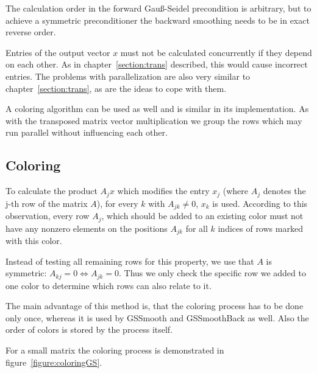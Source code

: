 \documentclass[a4paper,11pt]{scrartcl}
\begin{document}
The calculation order in the forward Gauß-Seidel precondition is arbitrary,
but to achieve a symmetric preconditioner the backward smoothing needs to be
in exact reverse order.

Entries of the output vector $x$ must not be calculated concurrently if they
depend on each other. As in chapter~\ref{section:trans} described, this would
cause incorrect entries. The problems with parallelization are also very
similar to chapter~\ref{section:trans}, as are the ideas to cope with them.

A coloring algorithm can be used as well and is similar in its implementation.
As with the transposed matrix vector multiplication we group the rows which
may run parallel without influencing each other.

\subsection{Coloring}
To calculate the product $A_jx$ which modifies the entry $x_j$ (where $A_j$
denotes the j-th row of the matrix $A$), for every $k$ with $A_{jk} \neq 0$,
$x_k$ is used. According to this observation, every row $A_j$, which should be
added to an existing color must not have any nonzero elements on the positions $A_{jk}$
for all $k$ indices of rows marked with this color.

Instead of testing all remaining rows for this property, we use that $A$ is
symmetric: $A_{kj} = 0 \Leftrightarrow A_{jk} = 0$. Thus we only check
the specific row we added to one color to determine which rows can also
relate to it.

The main advantage of this method is, that the coloring process has to be
done only once, whereas it is used by GSSmooth and GSSmoothBack as well.
Also the order of colors is stored by the process itself.

For a small matrix the coloring process is demonstrated in
figure~\ref{figure:coloringGS}.
\end{document}
